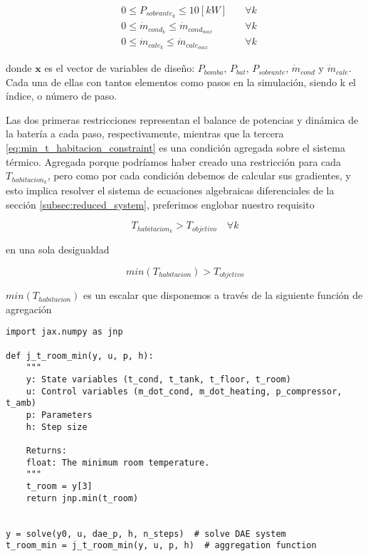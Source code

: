 \begin{align}
	                        & 0 \leq P_{sobrante_k} \leq 10[kW] \quad                                                                                    & \forall k     \\
	                        & 0 \leq \dot{m}_{cond_k} \leq \dot{m}_{cond_{max}} \quad                                                                    & \forall k     \\
	                        & 0 \leq \dot{m}_{cale_k} \leq \dot{m}_{cale_{max}} \quad                                                                    & \forall k
\end{align}


donde $\mathbf{x}$ es el vector de variables de diseño: $P_{bomba}$, $P_{bat}$,
$P_{sobrante}$, $\dot{m}_{cond}$ y $\dot{m}_{cale}$. Cada una de ellas con
tantos elementos como pasos en la simulación, siendo k el índice, o número de
paso.

Las dos primeras restricciones representan el balance de potencias y dinámica
de la batería a cada paso, respectivamente, mientras que la tercera
\eqref{eq:min_t_habitacion_constraint} es una condición agregada sobre el
sistema térmico. Agregada porque podríamos haber creado una restricción para
cada $T_{habitacion_k}$, pero como por cada condición debemos de calcular sus
gradientes, y esto implica resolver el sistema de ecuaciones algebraicas
diferenciales de la sección \ref{subsec:reduced_system}, preferimos englobar
nuestro requisito

\begin{equation*}
	T_{habitacion_k} > T_{objetivo}  \quad \forall k
\end{equation*}

en una sola desigualdad

\begin{equation*}
	min(T_{habitacion}) > T_{objetivo}
\end{equation*}


$min(T_{habitacion})$ es un escalar que disponemos a través de la siguiente
función de agregación

\begin{verbatim}
import jax.numpy as jnp

def j_t_room_min(y, u, p, h):
    """
    y: State variables (t_cond, t_tank, t_floor, t_room)
    u: Control variables (m_dot_cond, m_dot_heating, p_compressor, t_amb)
    p: Parameters
    h: Step size

    Returns:
    float: The minimum room temperature.
    """
    t_room = y[3]
    return jnp.min(t_room)


y = solve(y0, u, dae_p, h, n_steps)  # solve DAE system
t_room_min = j_t_room_min(y, u, p, h)  # aggregation function
\end{verbatim}


